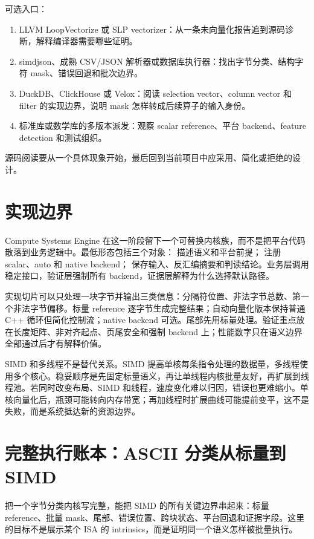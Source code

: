 \begin{sourcereadingbox}
可选入口：
\begin{enumerate}
  \item LLVM LoopVectorize 或 SLP vectorizer：从一条未向量化报告追到源码诊断，解释编译器需要哪些证明。
  \item simdjson、成熟 CSV/JSON 解析器或数据库执行器：找出字节分类、结构字符 mask、错误回退和批次边界。
  \item DuckDB、ClickHouse 或 Velox：阅读 selection vector、column vector 和 filter 的实现边界，说明 mask 怎样转成后续算子的输入身份。
  \item 标准库或数学库的多版本派发：观察 scalar reference、平台 backend、feature detection 和测试组织。
\end{enumerate}
源码阅读要从一个具体现象开始，最后回到当前项目中应采用、简化或拒绝的设计。
\end{sourcereadingbox}

\section{实现边界}

Compute Systems Engine 在这一阶段留下一个可替换内核族，而不是把平台代码散落到业务逻辑中。最低形态包括三个对象： 描述语义和平台前提； 注册 scalar、auto 和 native backend； 保存输入、反汇编摘要和判读结论。业务层调用稳定接口，验证层强制所有 backend，证据层解释为什么选择默认路径。

实现切片可以只处理一块字节并输出三类信息：分隔符位置、非法字节总数、第一个非法字节偏移。标量 reference 逐字节生成完整结果；自动向量化版本保持普通 C++ 循环但简化控制流；native backend 可选。尾部先用标量处理。验证重点放在长度矩阵、非对齐起点、页尾安全和强制 backend 上；性能数字只在语义边界全部通过后才有解释价值。

SIMD 和多线程不是替代关系。SIMD 提高单核每条指令处理的数据量，多线程使用多个核心。稳妥顺序是先固定标量语义，再让单线程内核批量友好，再扩展到线程池。若同时改变布局、SIMD 和线程，速度变化难以归因，错误也更难缩小。单核向量化后，瓶颈可能转向内存带宽；再加线程时扩展曲线可能提前变平，这不是失败，而是系统抵达新的资源边界。

\section{完整执行账本：ASCII 分类从标量到 SIMD}

把一个字节分类内核写完整，能把 SIMD 的所有关键边界串起来：标量 reference、批量 mask、尾部、错误位置、跨块状态、平台回退和证据字段。这里的目标不是展示某个 ISA 的 intrinsics，而是证明同一个语义怎样被批量执行。

